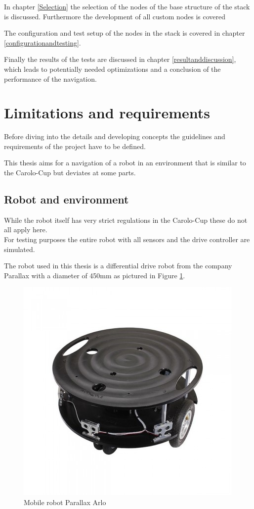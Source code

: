 In chapter \ref{Selection} the selection of the nodes of the base structure of the stack is discussed. Furthermore the development of all custom nodes is covered

The configuration and test setup of the nodes in the stack is covered in chapter \ref{configurationandtesting}.


Finally the results of the tests are discussed in chapter \ref{resultanddiscussion}, which leads to potentially needed optimizations and a conclusion of the performance of the navigation.

\section{Limitations and requirements}

Before diving into the details and developing concepts the guidelines and requirements of the project have to be defined.

This thesis aims for a navigation of a robot in an environment that is similar to the Carolo-Cup but deviates at some parts.

\subsection{Robot and environment}
While the robot itself has very strict regulations in the Carolo-Cup these do not all apply here.\\

For testing purposes the entire robot with all sensors and the drive controller are simulated.

The robot used in this thesis is a differential drive robot from the company Parallax with a diameter of 450mm as pictured in Figure \ref{arlore}.\\

\begin{figure}[H]
	\centering
	\includegraphics[width=.7\textwidth]{arlo real}
	
	\caption{Mobile robot Parallax Arlo \cite{arloreal}}
	\label{arlore}
\end{figure}


